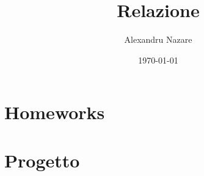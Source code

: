 \documentclass[a4paper,12pt]{article}
\title{Relazione}
\author{Alexandru Nazare}
\date{\today}
\begin{document}
\maketitle
\tableofcontents

\part{Homeworks}




\part{Progetto}

\end{document}
